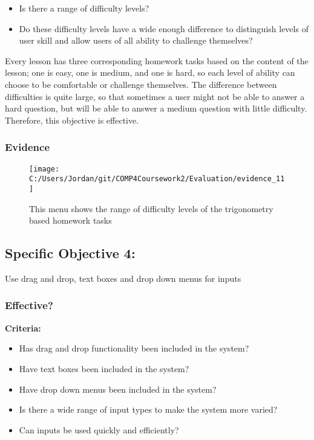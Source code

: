 \begin{itemize}
	\item Is there a range of difficulty levels?
	\item Do these difficulty levels have a wide enough difference to distinguish levels of user skill and allow users of all ability to challenge themselves?
\end{itemize}

Every lesson has three corresponding homework tasks based on the content of the lesson; one is easy, one is medium, and one is hard, so each level of ability can choose to be comfortable or challenge themselves. The difference between difficulties is quite large, so that sometimes a user might not be able to answer a hard question, but will be able to answer a medium question with little difficulty. Therefore, this objective is effective.

\subsubsection{Evidence}

\begin{figure}[H]
	\texttt{[image: C:/Users/Jordan/git/COMP4Coursework2/Evaluation/evidence\_11]}
	\caption{This menu shows the range of difficulty levels of the trigonometry based homework tasks}
\end{figure}

\subsection{Specific Objective 4: }

Use drag and drop, text boxes and drop down menus for inputs

\subsubsection{Effective?}

\textbf{Criteria: }

\begin{itemize}
	\item Has drag and drop functionality been included in the system?
	\item Have text boxes been included in the system?
	\item Have drop down menus been included in the system?
	\item Is there a wide range of input types to make the system more varied?
	\item Can inputs be used quickly and efficiently?
\end{itemize}

